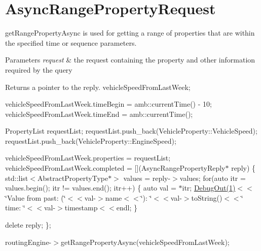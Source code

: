 \hypertarget{AsyncRangePropertyRequest-example}{\section{Async\-Range\-Property\-Request}
}
get\-Range\-Property\-Async is used for getting a range of properties that are within the specified time or sequence parameters. 
\begin{DoxyParams}{Parameters}
{\em request} & the request containing the property and other information required by the query \\
\hline
\end{DoxyParams}
\begin{DoxyReturn}{Returns}
a pointer to the reply. vehicle\-Speed\-From\-Last\-Week;
\end{DoxyReturn}
vehicle\-Speed\-From\-Last\-Week.\-time\-Begin = amb\-::current\-Time() -\/ 10; vehicle\-Speed\-From\-Last\-Week.\-time\-End = amb\-::current\-Time();

Property\-List request\-List; request\-List.\-push\-\_\-back(\-Vehicle\-Property\-::\-Vehicle\-Speed); request\-List.\-push\-\_\-back(\-Vehicle\-Property\-::\-Engine\-Speed);

vehicle\-Speed\-From\-Last\-Week.\-properties = request\-List; vehicle\-Speed\-From\-Last\-Week.\-completed = \mbox{[}\mbox{]}(Async\-Range\-Property\-Reply$\ast$ reply) \{ std\-::list$<$\-Abstract\-Property\-Type$\ast$$>$ values = reply-\/$>$values; for(auto itr = values.\-begin(); itr != values.\-end(); itr++) \{ auto val = $\ast$itr; \hyperlink{classDebugOut}{Debug\-Out(1)}$<$$<$\char`\"{}\-Value from past\-: (\char`\"{}$<$$<$val-\/$>$name$<$$<$\char`\"{})\-: \char`\"{}$<$$<$val-\/$>$to\-String()$<$$<$\char`\"{} time\-: \char`\"{}$<$$<$val-\/$>$timestamp$<$$<$endl; \}

delete reply; \};

routing\-Engine-\/$>$get\-Range\-Property\-Async(vehicle\-Speed\-From\-Last\-Week);


\begin{DoxyCodeInclude}
\end{DoxyCodeInclude}
 